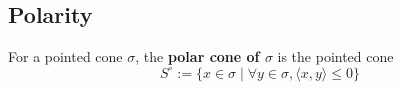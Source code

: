 \subsection{Polarity}

\begin{definition}
  \label{polar-cone}
  \lean{}
  \leanok
  For a pointed cone \( \sigma \), the {\bf polar cone of \( \sigma \)} is
  the pointed cone
  \[
      S^\circ := \{x \in \sigma \mid \forall y \in \sigma, \langle x, y \rangle
      \leq 0 \}
  \]
\end{definition}




